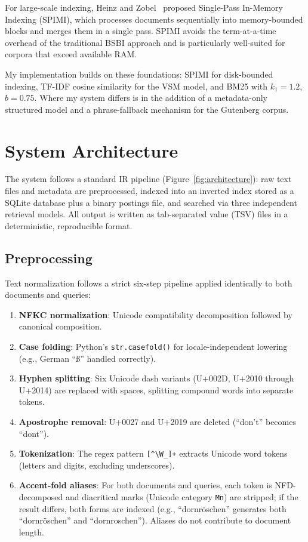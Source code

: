 \documentclass[sigconf,nonacm]{acmart}
\begin{document}
For large-scale indexing, Heinz and Zobel~\cite{heinz2003spimi} proposed
Single-Pass In-Memory Indexing (SPIMI), which processes documents sequentially
into memory-bounded blocks and merges them in a single pass.  SPIMI avoids the
term-at-a-time overhead of the traditional BSBI approach and is particularly
well-suited for corpora that exceed available RAM.

My implementation builds on these foundations: SPIMI for disk-bounded indexing,
TF-IDF cosine similarity for the VSM model, and BM25 with $k_1 = 1.2$,
$b = 0.75$.  Where my system differs is in the addition of a metadata-only
structured model and a phrase-fallback mechanism for the Gutenberg corpus.

\section{System Architecture}



The system follows a standard IR pipeline (Figure~\ref{fig:architecture}):
raw text files and metadata are preprocessed, indexed into an inverted index
stored as a SQLite database plus a binary postings file, and searched via three
independent retrieval models.  All output is written as tab-separated value
(TSV) files in a deterministic, reproducible format.

\subsection{Preprocessing}
Text normalization follows a strict six-step pipeline applied identically to
both documents and queries:
\begin{enumerate}[nosep]
  \item \textbf{NFKC normalization}: Unicode compatibility decomposition
        followed by canonical composition.
  \item \textbf{Case folding}: Python's \texttt{str.casefold()} for
        locale-independent lowering (e.g., German ``\ss'' handled correctly).
  \item \textbf{Hyphen splitting}: Six Unicode dash variants (U+002D,
        U+2010 through U+2014) are replaced with spaces, splitting compound
        words into separate tokens.
  \item \textbf{Apostrophe removal}: U+0027 and U+2019 are deleted
        (``don't'' becomes ``dont'').
  \item \textbf{Tokenization}: The regex pattern
        \verb|[^\W_]+| extracts Unicode word tokens (letters and
        digits, excluding underscores).
  \item \textbf{Accent-fold aliases}: For both documents and queries,
        each token is NFD-decomposed and diacritical marks (Unicode
        category \texttt{Mn}) are stripped; if the result differs, both
        forms are indexed (e.g., ``dornr\"oschen'' generates both
        ``dornr\"oschen'' and ``dornroschen'').  Aliases do not
        contribute to document length.
\end{enumerate}
\end{document}
